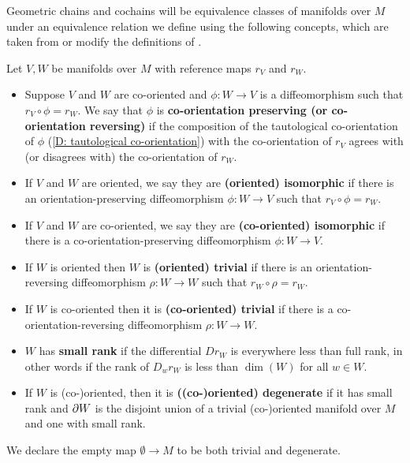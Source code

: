
Geometric chains and cochains will be equivalence classes of manifolds over $M$ under an equivalence relation we define using the following concepts, which are taken from or modify
the definitions of \cite{Lipy14}.

\begin{definition}\label{D: equiv triv and small}
	Let $V, W$ be manifolds over $M$ with reference maps $r_V$ and $r_W$.
	\begin{itemize}
		\item Suppose $V$ and $W$ are co-oriented and $\phi \colon W \to V$ is a diffeomorphism such that $r_V \circ \phi = r_W$.
		We say that $\phi$ is \textbf{co-orientation preserving (or co-orientation reversing)} if the composition of the tautological co-orientation of $\phi$ (\cref{D: tautological co-orientation}) with the co-orientation of $r_V$ agrees with (or disagrees with) the co-orientation of $r_W$.
		\item If $V$ and $W$ are oriented, we say they are \textbf{(oriented) isomorphic} if there is an orientation-preserving diffeomorphism $\phi \colon W \to V$ such that $r_V \circ \phi = r_W$.
		\item If $V$ and $W$ are co-oriented, we say they are \textbf{(co-oriented) isomorphic} if there is a co-orientation-preserving diffeomorphism $\phi \colon W \to V$.
		\item If $W$ is oriented then $W$ is \textbf{(oriented) trivial} if there is an orientation-reversing diffeomorphism $\rho \colon W \to W$ such that $r_W \circ \rho = r_W$.
		\item If $W$ is co-oriented then it is \textbf{(co-oriented) trivial} if there is a co-orientation-reversing diffeomorphism $\rho \colon W \to W$.
		\item $W$ has \textbf{small rank} if the differential $D r_W$ is everywhere less than full rank, in other words if the rank of $D_w r_W$ is less than $\dim(W)$ for all $w\in W$.
		\item If $W$ is (co\nobreakdash-)oriented, then it is \textbf{((co\nobreakdash-)oriented) degenerate} if it has small rank and ${\partial W}$ is the disjoint union of a trivial (co\nobreakdash-)oriented manifold over $M$ and one with small rank.
	\end{itemize}
	We declare the empty map $\emptyset \to M$ to be both trivial and degenerate.
\end{definition}


